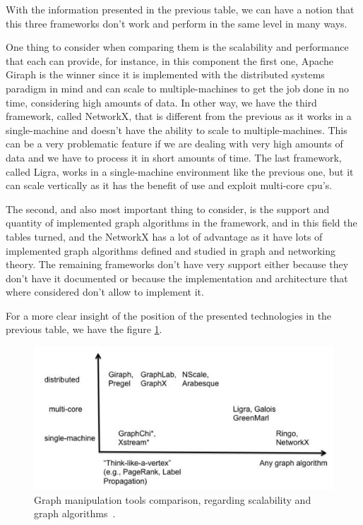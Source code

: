 With the information presented in the previous table, we can have a notion that this three frameworks don't work and perform in the same level in many ways.

One thing to consider when comparing them is the scalability and performance that each can provide, for instance, in this component the first one, Apache Giraph is the winner since it is implemented with the distributed systems paradigm in mind and can scale to multiple-machines to get the job done in no time, considering high amounts of data. In other way, we have the third framework, called NetworkX, that is different from the previous as it works in a single-machine and doesn't have the ability to scale to multiple-machines. This can be a very problematic feature if we are dealing with very high amounts of data and we have to process it in short amounts of time. The last framework, called Ligra, works in a single-machine environment like the previous one, but it can scale vertically as it has the benefit of use and exploit multi-core \gls{cpu}'s.

The second, and also most important thing to consider, is the support and quantity of implemented graph algorithms in the framework, and in this field the tables turned, and the NetworkX has a lot of advantage as it have lots of implemented graph algorithms defined and studied in graph and networking theory. The remaining frameworks don't have very support either because they don't have it documented or because the implementation and architecture that where considered don't allow to implement it.

For a more clear insight of the position of the presented technologies in the previous table, we have the figure \ref{fig:graph_manipulation_and_performance_tools_diagram_comparison}.

\begin{figure}
    \centering
    \includegraphics[width=1.0\linewidth]{images/graph_manipulation_tools_diagram_comparison.pdf}
    \caption{Graph manipulation tools comparison, regarding scalability and graph algorithms~\cite{graph_data_management_systems}.}
    \label{fig:graph_manipulation_and_performance_tools_diagram_comparison}
\end{figure}


